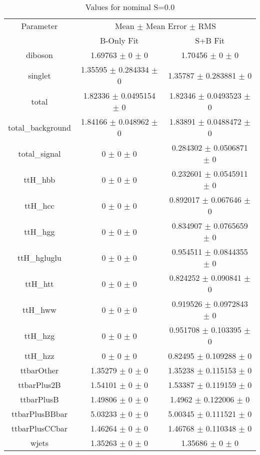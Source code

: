 \begin{table}
\centering
\caption{Values for nominal S=0.0}
\begin{tabular}{ccc}
\toprule
Parameter & \multicolumn{2}{c}{Mean $\pm$ Mean Error $\pm$ RMS}\\
 & B-Only Fit & S+B Fit\\
\midrule
diboson & \num{1.69763} $\pm$ \num{0} $\pm$ \num{0} & \num{1.70456} $\pm$ \num{0} $\pm$ \num{0}\\
singlet & \num{1.35595} $\pm$ \num{0.284334} $\pm$ \num{0} & \num{1.35787} $\pm$ \num{0.283881} $\pm$ \num{0}\\
total & \num{1.82336} $\pm$ \num{0.0495154} $\pm$ \num{0} & \num{1.82346} $\pm$ \num{0.0493523} $\pm$ \num{0}\\
total\_background & \num{1.84166} $\pm$ \num{0.048962} $\pm$ \num{0} & \num{1.83891} $\pm$ \num{0.0488472} $\pm$ \num{0}\\
total\_signal & \num{0} $\pm$ \num{0} $\pm$ \num{0} & \num{0.284302} $\pm$ \num{0.0506871} $\pm$ \num{0}\\
ttH\_hbb & \num{0} $\pm$ \num{0} $\pm$ \num{0} & \num{0.232601} $\pm$ \num{0.0545911} $\pm$ \num{0}\\
ttH\_hcc & \num{0} $\pm$ \num{0} $\pm$ \num{0} & \num{0.892017} $\pm$ \num{0.067646} $\pm$ \num{0}\\
ttH\_hgg & \num{0} $\pm$ \num{0} $\pm$ \num{0} & \num{0.834907} $\pm$ \num{0.0765659} $\pm$ \num{0}\\
ttH\_hgluglu & \num{0} $\pm$ \num{0} $\pm$ \num{0} & \num{0.954511} $\pm$ \num{0.0844355} $\pm$ \num{0}\\
ttH\_htt & \num{0} $\pm$ \num{0} $\pm$ \num{0} & \num{0.824252} $\pm$ \num{0.090841} $\pm$ \num{0}\\
ttH\_hww & \num{0} $\pm$ \num{0} $\pm$ \num{0} & \num{0.919526} $\pm$ \num{0.0972843} $\pm$ \num{0}\\
ttH\_hzg & \num{0} $\pm$ \num{0} $\pm$ \num{0} & \num{0.951708} $\pm$ \num{0.103395} $\pm$ \num{0}\\
ttH\_hzz & \num{0} $\pm$ \num{0} $\pm$ \num{0} & \num{0.82495} $\pm$ \num{0.109288} $\pm$ \num{0}\\
ttbarOther & \num{1.35279} $\pm$ \num{0} $\pm$ \num{0} & \num{1.35238} $\pm$ \num{0.115153} $\pm$ \num{0}\\
ttbarPlus2B & \num{1.54101} $\pm$ \num{0} $\pm$ \num{0} & \num{1.53387} $\pm$ \num{0.119159} $\pm$ \num{0}\\
ttbarPlusB & \num{1.49806} $\pm$ \num{0} $\pm$ \num{0} & \num{1.4962} $\pm$ \num{0.122006} $\pm$ \num{0}\\
ttbarPlusBBbar & \num{5.03233} $\pm$ \num{0} $\pm$ \num{0} & \num{5.00345} $\pm$ \num{0.111521} $\pm$ \num{0}\\
ttbarPlusCCbar & \num{1.46264} $\pm$ \num{0} $\pm$ \num{0} & \num{1.46768} $\pm$ \num{0.110348} $\pm$ \num{0}\\
wjets & \num{1.35263} $\pm$ \num{0} $\pm$ \num{0} & \num{1.35686} $\pm$ \num{0} $\pm$ \num{0}\\
\bottomrule
\end{tabular}
\end{table}